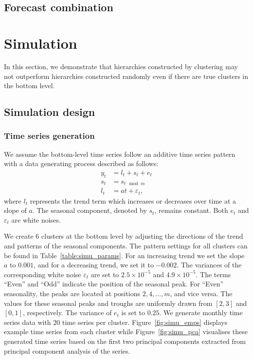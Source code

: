 \documentclass[a4paper,review,12pt,authoryear]{elsarticle}
\begin{document}
\subsection{Forecast combination}

\section{Simulation}
\label{sec:simulation}

In this section, we demonstrate that hierarchies constructed by clustering may not outperform hierarchies constructed randomly even if there are true clusters in the bottom level.

\subsection{Simulation design}

\subsubsection*{Time series generation}

We assume the bottom-level time series follow an additive time series pattern with a data generating process described as follows:
\begin{equation}
    \label{simu:DGP}
    \begin{aligned}
    y_t &= l_t + s_t + e_t \\
    s_t &= s_{t\mod m} \\
    l_t &= a t + \varepsilon_t,
    \end{aligned}
\end{equation}
where $l_t$ represents the trend term which increases or decreases over time at a slope of $a$. The seasonal component, denoted by $s_t$, remains constant. Both $e_t$ and $\varepsilon_t$ are white noises.

We create $6$ clusters at the bottom level by adjusting the directions of the trend and patterns of the seasonal components.
The pattern settings for all clusters can be found in Table~\ref{table:simu_params}. For an increasing trend we set the slope $a$ to $0.001$, and for a decreasing trend, we set it to $-0.002$. The variances of the corresponding white noise $\varepsilon_t$ are set to $2.5\times 10^{-5}$ and $4.9\times 10^{-5}$. The terms ``Even'' and ``Odd'' indicate the position of the seasonal peak. For ``Even'' seasonality, the peaks are located at positions $2, 4, \dots, m$, and vice versa. The values for these seasonal peaks and troughs are uniformly drawn from $[2, 3]$ and $[0,1]$, respectively. The variance of $e_t$ is set to $0.25$. We generate monthly time series data with $20$ time series per cluster. Figure~\ref{fig:simu_emps} displays example time series from each cluster while Figure~\ref{fig:simu_pca} visualises these generated time series based on the first two principal components extracted from principal component analysis of the series.
\end{document}

